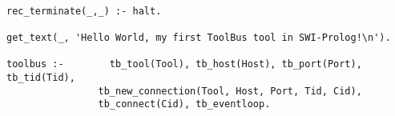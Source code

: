 \begin{verbatim}

rec_terminate(_,_) :- halt.

get_text(_, 'Hello World, my first ToolBus tool in SWI-Prolog!\n').

toolbus :-        tb_tool(Tool), tb_host(Host), tb_port(Port), tb_tid(Tid),
                tb_new_connection(Tool, Host, Port, Tid, Cid),
                tb_connect(Cid), tb_eventloop.

\end{verbatim}

